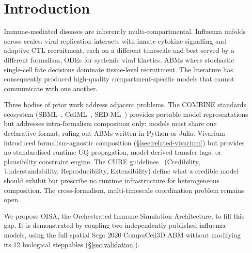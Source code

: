 \documentclass[conference,letterpaper,10pt]{IEEEtran}
\begin{document}
\section{Introduction}
Immune-mediated diseases are inherently multi-compartmental. Influenza
unfolds across scales: viral replication interacts with innate cytokine
signalling and adaptive CTL recruitment, each on a different timescale and
best served by a different formalism, ODEs for systemic viral kinetics,
ABMs where stochastic single-cell fate decisions dominate tissue-level
recruitment. The literature has consequently produced high-quality
compartment-specific models that cannot communicate with one another.

Three bodies of prior work address adjacent problems. The COMBINE
standards ecosystem (SBML~\cite{hucka2015sbml},
CellML~\cite{clerx2020cellml}, SED-ML~\cite{waltemath2011sedml})
provides portable model representations but addresses intra-formalism
composition only: models must share one declarative format, ruling out
ABMs written in Python or Julia. Vivarium~\cite{agmon2022vivarium}
introduced formalism-agnostic composition
(\S\ref{sec:related-vivarium}) but provides no standardised runtime UQ
propagation, model-derived transfer lags, or plausibility constraint
engine. The CURE guidelines~\cite{sauro2025cure} (Credibility,
Understandability, Reproducibility, Extensibility) define what a credible
model should exhibit but prescribe no runtime infrastructure for
heterogeneous composition. The cross-formalism, multi-timescale coordination
problem remains open.

We propose OISA, the Orchestrated Immune Simulation Architecture, to fill
this gap. It is demonstrated by coupling two independently published
influenza models, using the full spatial Sego 2020 CompuCell3D ABM without
modifying its 12 biological steppables (\S\ref{sec:validation}).
\end{document}
